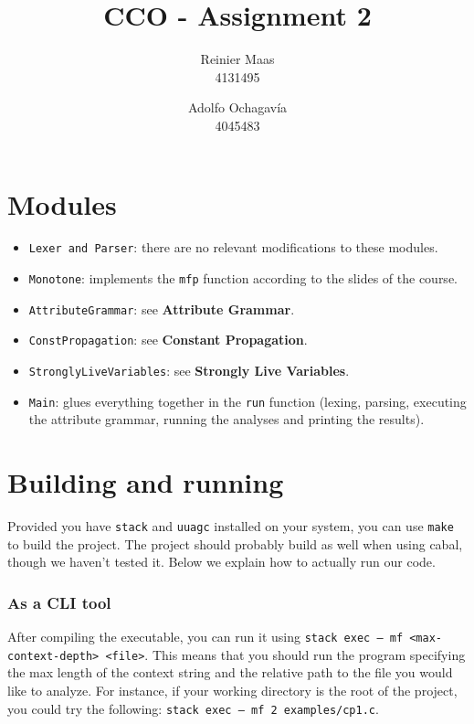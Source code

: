 \documentclass{article}
\author{
  Reinier Maas \\ 4131495
  \and
  Adolfo Ochagavía \\ 4045483
}
\title{CCO - Assignment 2}
\begin{document}
\maketitle

\section*{Modules}

\begin{itemize}
\item \texttt{Lexer and Parser}: there are no relevant modifications to these modules.
\item \texttt{Monotone}: implements the \texttt{mfp} function according to the slides of the course.
\item \texttt{AttributeGrammar}: see \textbf{Attribute Grammar}.
\item \texttt{ConstPropagation}: see \textbf{Constant Propagation}.
\item \texttt{StronglyLiveVariables}: see \textbf{Strongly Live Variables}.
\item \texttt{Main}: glues everything together in the \texttt{run} function (lexing, parsing, executing the attribute grammar, running the analyses and printing the results).
\end{itemize}

\section*{Building and running}

Provided you have \texttt{stack} and \texttt{uuagc} installed on your system, you can use \texttt{make} to build the project.
The project should probably build as well when using cabal, though we haven't tested it.
Below we explain how to actually run our code.

\subsubsection*{As a CLI tool}

After compiling the executable, you can run it using \texttt{stack exec -- mf <max-context-depth> <file>}.
This means that you should run the program specifying the max length of the context string and the relative path to the file you would like to analyze.
For instance, if your working directory is the root of the project, you could try the following: \texttt{stack exec -- mf 2 examples/cp1.c}.
\end{document}
